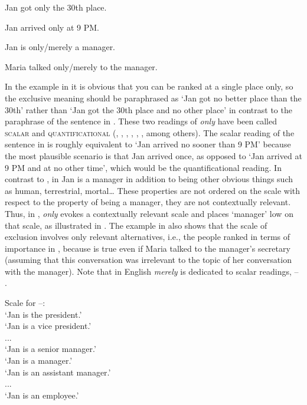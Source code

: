 \documentclass[output=paper,colorlinks,citecolor=brown]{langscibook}
\begin{document}
\ea\label{ex:tom:4}
Jan got only the 30th place.
\z

\ea\label{ex:tom:5}
Jan arrived only at 9 PM.
\z

\ea\label{ex:tom:6}
Jan is only/merely a manager.
\z

\ea\label{ex:tom:7}
Maria talked only/merely to the manager.
\z

\noindent In the example in  it is obvious that you can be ranked at a single place only, so the exclusive meaning should be paraphrased as `Jan got no better place than the 30th' rather than `Jan got the 30th place and no other place' in contrast to the paraphrase of the sentence in . These two readings of \textit{only} have been called \textsc{scalar} and \textsc{quantificational} (\citealt{bonomicasalegno93}, \citealt{krifka93}, \citealt{klinedinst05}, \citealt{riester06}, \citealt{beaverclark08}, \citealt{zeevat09}, among others). The scalar reading of the sentence in  is roughly equivalent to `Jan arrived no sooner than 9 PM' because the most plausible scenario is that Jan arrived once, as opposed to `Jan arrived at 9 PM and at no other time', which would be the quantificational reading. In contrast to , in  Jan is a manager in addition to being other obvious things such as human, terrestrial, mortal… These properties are not ordered on the scale with respect to the property of being a manager, they are not contextually relevant. Thus, in , \textit{only} evokes a contextually relevant scale and places ‘manager’ low on that scale, as illustrated in . The example in  also shows that the scale of exclusion involves only relevant alternatives, i.e., the people ranked in terms of importance in , because  is true even if Maria talked to the manager’s secretary (assuming that this conversation was irrelevant to the topic of her conversation with the manager). Note that in English \textit{merely} is dedicated to scalar readings, -- \citep{coppockbeaver11, coppockbeaver14}.

\ea\label{ex:tom:8}
Scale for --:\\
`Jan is the president.'\\
`Jan is a vice president.'\\
...\\
`Jan is a senior manager.'\\
`Jan is a manager.'\\
`Jan is an assistant manager.'\\
...\\
`Jan is an employee.'
\z 
\end{document}
